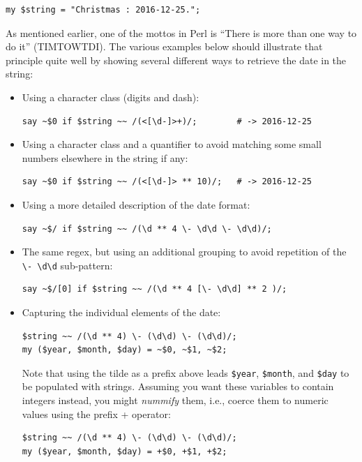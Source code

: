 \begin{verbatim}
my $string = "Christmas : 2016-12-25.";
\end{verbatim}
%

As mentioned earlier, one of the mottos in Perl is ``There 
is more than one way to do it'' (TIMTOWTDI). The various 
examples below should illustrate that principle quite well 
by showing several different ways to retrieve the date in 
the string:

\begin{itemize}

\item Using a character class (digits and dash):

\begin{verbatim}
say ~$0 if $string ~~ /(<[\d-]>+)/;        # -> 2016-12-25
\end{verbatim}
%

\item Using a character class and a quantifier to avoid 
matching some small numbers elsewhere in the string if any:

\begin{verbatim}
say ~$0 if $string ~~ /(<[\d-]> ** 10)/;   # -> 2016-12-25
\end{verbatim}
%

\item Using a more detailed description of the date format:
\begin{verbatim}
say ~$/ if $string ~~ /(\d ** 4 \- \d\d \- \d\d)/;
\end{verbatim}
%

\item The same regex, but using an additional grouping to avoid 
repetition of the \verb'\- \d\d' sub-pattern: 

\begin{verbatim}
say ~$/[0] if $string ~~ /(\d ** 4 [\- \d\d] ** 2 )/; 
\end{verbatim}
%

\item Capturing the individual elements of the date:
\begin{verbatim}
$string ~~ /(\d ** 4) \- (\d\d) \- (\d\d)/;
my ($year, $month, $day) = ~$0, ~$1, ~$2;
\end{verbatim}
%
Note that using the tilde as a prefix above leads 
\verb'$year', \verb'$month', and \verb'$day' to be 
populated with strings. Assuming you want these variables 
to contain integers instead, you might \emph{nummify} them, i.e., 
coerce them to numeric values using the prefix + operator:
\begin{verbatim}
$string ~~ /(\d ** 4) \- (\d\d) \- (\d\d)/;
my ($year, $month, $day) = +$0, +$1, +$2;
\end{verbatim}
%
 


\end{itemize}
